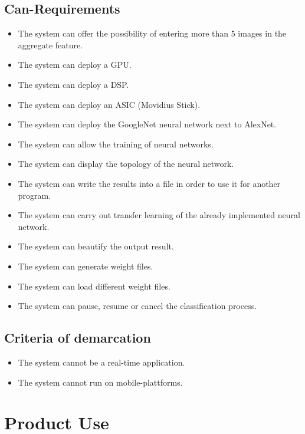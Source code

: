 \documentclass[parskip=full]{scrartcl}
\begin{document}
\subsection{Can-Requirements}

\begin{itemize}
	\item The system can offer the possibility of entering more than 5 images in the aggregate feature.
	\item The system can deploy a GPU.
	\item The system can deploy a DSP.
	\item The system can deploy an ASIC (Movidius Stick).
	\item The system can deploy the GoogleNet neural network next to AlexNet. 
	\item The system can allow the training of neural networks.
	\item The system can display the topology of the neural network.
	\item The system can write the results into a file in order to use it for another program.
	\item The system can carry out transfer learning of the already implemented neural network.
	\item The system can beautify the output result.
	\item The system can generate weight files.
	\item The system can load different weight files.
	\item The system can pause, resume or cancel the classification process.
\end{itemize}

\subsection{Criteria of demarcation}

\begin{itemize}
	\item The system cannot be a real-time application.
	\item The system cannot run on mobile-plattforms.
\end{itemize}

\pagebreak






\section{Product Use}
\end{document}

